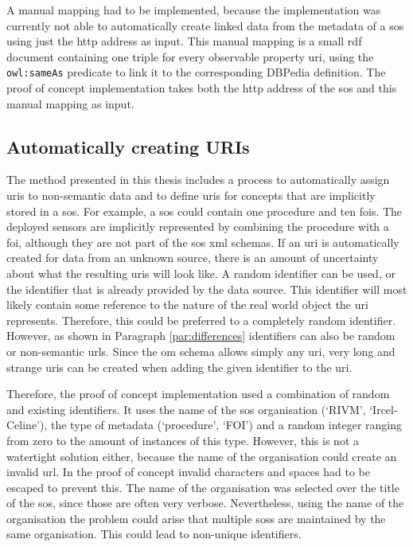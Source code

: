  A manual mapping had to be implemented, because the implementation was currently not able to automatically create linked data from the metadata of a \ac{sos} using just the \ac{http} address as input. This manual mapping is a small \ac{rdf} document containing one triple for every observable property \ac{uri}, using the \texttt{owl:sameAs} predicate to link it to the corresponding DBPedia definition. The proof of concept implementation takes both the \ac{http} address of the \ac{sos} and this manual mapping as input.          

\subsection{Automatically creating URIs}
The method presented in this thesis includes a process to automatically assign \acp{uri} to non-semantic data and to define \acp{uri} for concepts that are implicitly stored in a \ac{sos}. For example, a \ac{sos} could contain one procedure and ten \acp{foi}. The deployed sensors are implicitly represented by combining the procedure with a \ac{foi}, although they are not part of the \ac{sos} \ac{xml} schemas. If an \ac{uri} is automatically created for data from an unknown source, there is an amount of uncertainty about what the resulting \acp{uri} will look like. A random identifier can be used, or the identifier that is already provided by the data source. This identifier will most likely contain some reference to the nature of the real world object the \ac{uri} represents. Therefore, this could be preferred to a completely random identifier. However, as shown in Paragraph \ref{par:differences} identifiers can also be random or non-semantic \acp{url}. Since the \ac{om} schema allows simply any \ac{uri}, very long and strange \acp{uri} can be created when adding the given identifier to the \ac{uri}. 

Therefore, the proof of concept implementation used a combination of random and existing identifiers. It uses the name of the \ac{sos} organisation (`RIVM', `Ircel-Celine'), the type of metadata (`procedure', `FOI') and a random integer ranging from zero to the amount of instances of this type. However, this is not a watertight solution either, because the name of the organisation could create an invalid \ac{url}. In the proof of concept invalid characters and spaces had to be escaped to prevent this. The name of the organisation was selected over the title of the \ac{sos}, since those are often very verbose. Nevertheless, using the name of the organisation the problem could arise that multiple \aclp{sos} are maintained by the same organisation. This could lead to non-unique identifiers. 

